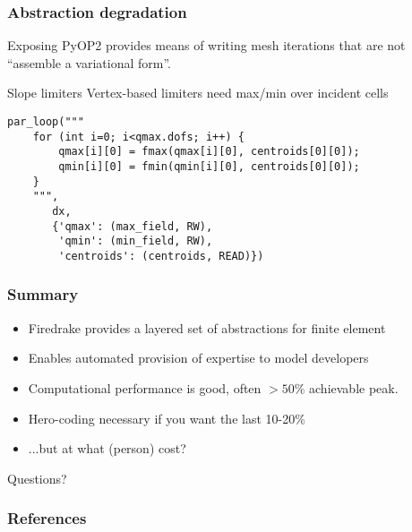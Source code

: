 \documentclass[presentation]{beamer}
\begin{document}
\begin{frame}[fragile]
  \frametitle{Abstraction degradation}
  Exposing PyOP2 provides means of writing mesh iterations that are
  not ``assemble a variational form''.

  \begin{exampleblock}{Slope limiters}
    Vertex-based limiters need max/min over incident cells
\begin{verbatim}
par_loop("""
    for (int i=0; i<qmax.dofs; i++) {
        qmax[i][0] = fmax(qmax[i][0], centroids[0][0]);
        qmin[i][0] = fmin(qmin[i][0], centroids[0][0]);
    }
    """,
       dx,
       {'qmax': (max_field, RW),
        'qmin': (min_field, RW),
        'centroids': (centroids, READ)})
\end{verbatim}
  \end{exampleblock}
\end{frame}

\begin{frame}
  \frametitle{Summary}
  \begin{itemize}
  \item Firedrake provides a layered set of abstractions for finite
    element
  \item Enables automated provision of expertise to model developers
  \item Computational performance is good, often $>50\%$ achievable
    peak.
  \item Hero-coding necessary if you want the last 10-20\%
  \item ...but at what (person) cost?
  \end{itemize}
\end{frame}
\begin{frame}[standout]
  Questions?
\end{frame}

\appendix
\begin{frame}
  \frametitle{References}
  \printbibliography[heading=none]
\end{frame}
\end{document}
